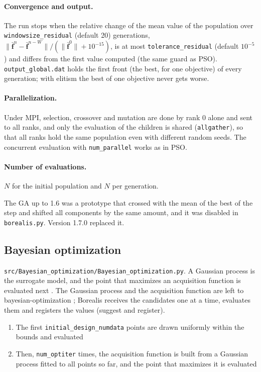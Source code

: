 \documentclass[11pt,a4paper]{article}
\begin{document}
\paragraph{Convergence and output.} The run stops when the relative change of the mean value of the population over \texttt{windowsize\_residual} (default 20) generations, $\|\bar{\mathbf{f}}^n - \bar{\mathbf{f}}^{n-W}\| / (\|\bar{\mathbf{f}}^0\| + 10^{-15})$, is at most \texttt{tolerance\_residual} (default $10^{-5}$) and differs from the first value computed (the same guard as PSO). \texttt{output\_global.dat} holds the first front (the best, for one objective) of every generation; with elitism the best of one objective never gets worse.

\paragraph{Parallelization.} Under MPI, selection, crossover and mutation are done by rank 0 alone and sent to all ranks, and only the evaluation of the children is shared (\texttt{allgather}), so that all ranks hold the same population even with different random seeds. The concurrent evaluation with \texttt{num\_parallel} works as in PSO.

\paragraph{Number of evaluations.} $N$ for the initial population and $N$ per generation.

The GA up to 1.6 was a prototype that crossed with the mean of the best of the step and shifted all components by the same amount, and it was disabled in \texttt{borealis.py}. Version 1.7.0 replaced it.

\subsection{Bayesian optimization}\label{sec:bo}

\texttt{src/Bayesian\_optimization/Bayesian\_optimization.py}. A Gaussian process is the surrogate model, and the point that maximizes an acquisition function is evaluated next \cite{jones1998}. The Gaussian process and the acquisition function are left to bayesian-optimization \cite{bayesopt}; Borealis receives the candidates one at a time, evaluates them and registers the values (suggest and register).

\begin{enumerate}
\item The first \texttt{initial\_design\_numdata} points are drawn uniformly within the bounds and evaluated
\item Then, \texttt{num\_optiter} times, the acquisition function is built from a Gaussian process fitted to all points so far, and the point that maximizes it is evaluated
\end{enumerate}
\end{document}
